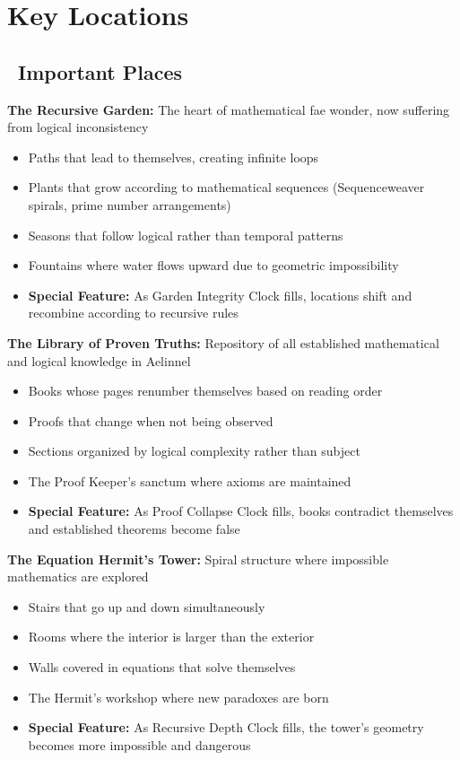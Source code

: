 \documentclass[11pt]{article}
\begin{document}
\section{Key Locations}

\subsection*{\faBuilding\ Important Places}

\textbf{The Recursive Garden:}
The heart of mathematical fae wonder, now suffering from logical inconsistency
\begin{itemize}
    \item Paths that lead to themselves, creating infinite loops
    \item Plants that grow according to mathematical sequences (Sequenceweaver spirals, prime number arrangements)
    \item Seasons that follow logical rather than temporal patterns
    \item Fountains where water flows upward due to geometric impossibility
    \item \textbf{Special Feature:} As Garden Integrity Clock fills, locations shift and recombine according to recursive rules
\end{itemize}

\textbf{The Library of Proven Truths:}
Repository of all established mathematical and logical knowledge in Aelinnel
\begin{itemize}
    \item Books whose pages renumber themselves based on reading order
    \item Proofs that change when not being observed
    \item Sections organized by logical complexity rather than subject
    \item The Proof Keeper's sanctum where axioms are maintained
    \item \textbf{Special Feature:} As Proof Collapse Clock fills, books contradict themselves and established theorems become false
\end{itemize}

\textbf{The Equation Hermit's Tower:}
Spiral structure where impossible mathematics are explored
\begin{itemize}
    \item Stairs that go up and down simultaneously
    \item Rooms where the interior is larger than the exterior
    \item Walls covered in equations that solve themselves
    \item The Hermit's workshop where new paradoxes are born
    \item \textbf{Special Feature:} As Recursive Depth Clock fills, the tower's geometry becomes more impossible and dangerous
\end{itemize}
\end{document}
